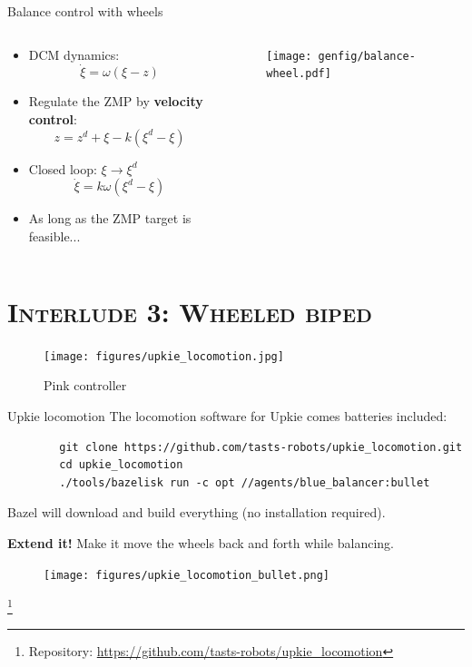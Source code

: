 \documentclass[9pt, aspectratio=43]{beamer}
\newcommand\blfootnote[1]{%
  \begingroup
  \renewcommand\thefootnote{}%
  \footnote{#1}%
  \addtocounter{footnote}{-1}%
  \endgroup
}
\def\xid{\dot{\xi}}
\begin{document}
\begin{frame}{Balance control with wheels}
    \begin{columns}
        \begin{column}{0.55\columnwidth}
            \begin{itemize}
                \item DCM dynamics:
                    $$ \xid = \omega (\xi - z) $$
                \item Regulate the ZMP by \textbf{velocity control}:
                    $$ z = z^d + \xi - k(\xi^d - \xi)$$
                \item Closed loop: $\xi \to \xi^d$
                    $$ \xid = k\omega (\xi^d - \xi) $$
                \item As long as the ZMP target is feasible...
            \end{itemize}
        \end{column}
        \begin{column}{0.45\columnwidth}
            \begin{figure}
                \centering
                \texttt{[image: genfig/balance-wheel.pdf]}
            \end{figure}
        \end{column}
    \end{columns}
\end{frame}


\section*{\textsc{Interlude 3: Wheeled biped}}

\begin{frame}
    \begin{figure}
        \centering
        \texttt{[image: figures/upkie\_locomotion.jpg]}
        \caption{Pink controller}
    \end{figure}
\end{frame}

\begin{frame}[fragile]{Upkie locomotion}
    The locomotion software for Upkie comes batteries included:
    \begin{verbatim}
        git clone https://github.com/tasts-robots/upkie_locomotion.git
        cd upkie_locomotion
        ./tools/bazelisk run -c opt //agents/blue_balancer:bullet
    \end{verbatim}
    Bazel will download and build everything (no installation required).

    \textbf{Extend it!} Make it move the wheels back and forth while balancing.

    \begin{figure}
        \centering
        \texttt{[image: figures/upkie\_locomotion\_bullet.png]}
    \end{figure}
    \blfootnote{
        Repository: \url{https://github.com/tasts-robots/upkie_locomotion}
    }
\end{frame}
\end{document}
